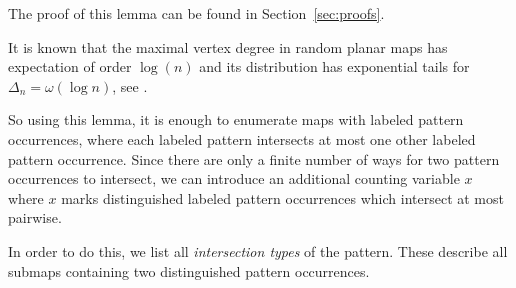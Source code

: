 \documentclass[reqno, 11pt]{amsart}
\theoremstyle{definition}
\theoremstyle{remark}
\numberwithin{equation}{section}
\begin{document}
The proof of this lemma can be found in Section~\ref{sec:proofs}. 

It is known that the maximal vertex degree in random planar maps has expectation of order $\log(n)$ and its distribution has exponential tails for $\Delta_n = \omega(\log n)$, see \cite{max_deg}. 

So using this lemma, it is enough to enumerate maps with labeled pattern occurrences, where each labeled pattern intersects at most one other labeled pattern occurrence. Since there are only a finite number of ways for two pattern occurrences to intersect, we can introduce an additional counting variable $x$ where $x$ marks distinguished labeled pattern occurrences which intersect at most pairwise.

In order to do this, we list all \emph{intersection types} of the pattern. These describe all submaps containing two distinguished pattern occurrences.
\end{document}

